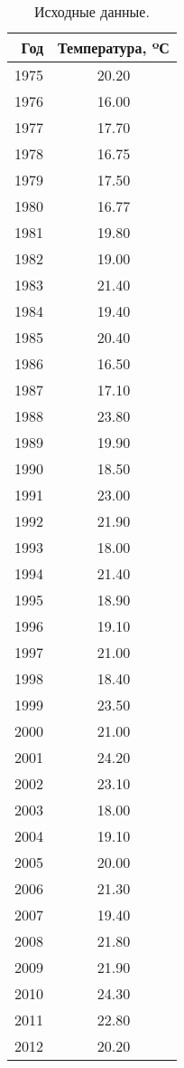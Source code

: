 \begin{table}[H]
\centering
\begin{tabular}{|rc|}
  \hline
Год & Температура, ºС \\ 
  \hline
1975 & 20.20 \\ 
  1976 & 16.00 \\ 
  1977 & 17.70 \\ 
  1978 & 16.75 \\ 
  1979 & 17.50 \\ 
  1980 & 16.77 \\ 
  1981 & 19.80 \\ 
  1982 & 19.00 \\ 
  1983 & 21.40 \\ 
  1984 & 19.40 \\ 
  1985 & 20.40 \\ 
  1986 & 16.50 \\ 
  1987 & 17.10 \\ 
  1988 & 23.80 \\ 
  1989 & 19.90 \\ 
  1990 & 18.50 \\ 
  1991 & 23.00 \\ 
  1992 & 21.90 \\ 
  1993 & 18.00 \\ 
  1994 & 21.40 \\ 
  1995 & 18.90 \\ 
  1996 & 19.10 \\ 
  1997 & 21.00 \\ 
  1998 & 18.40 \\ 
  1999 & 23.50 \\ 
  2000 & 21.00 \\ 
  2001 & 24.20 \\ 
  2002 & 23.10 \\ 
  2003 & 18.00 \\ 
  2004 & 19.10 \\ 
  2005 & 20.00 \\ 
  2006 & 21.30 \\ 
  2007 & 19.40 \\ 
  2008 & 21.80 \\ 
  2009 & 21.90 \\ 
  2010 & 24.30 \\ 
  2011 & 22.80 \\ 
  2012 & 20.20 \\ 
   \hline
\end{tabular}
\caption{Исходные данные.} 
\label{table:source}
\end{table}
